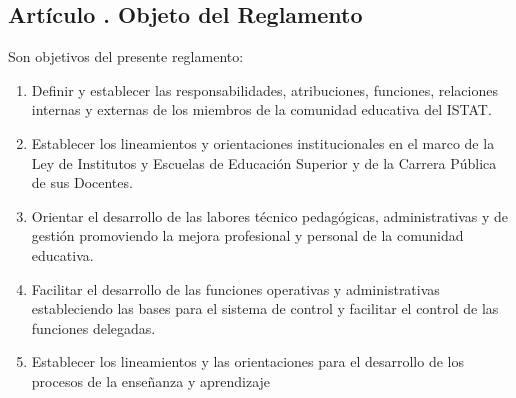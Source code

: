 \subsection{Artículo . Objeto del Reglamento}
\addtocounter{ns}{1}
Son objetivos del presente reglamento:
\begin{enumerate}
\item Definir y establecer las responsabilidades, atribuciones, funciones, relaciones internas y externas de los miembros de la comunidad educativa del ISTAT. 
\item Establecer los lineamientos y orientaciones institucionales en el marco de la Ley de Institutos y Escuelas de Educación Superior y de la Carrera Pública de sus Docentes.  
\item Orientar el desarrollo de las labores técnico pedagógicas, administrativas y de gestión promoviendo la mejora profesional y personal de la comunidad educativa.  
\item Facilitar el desarrollo de las funciones operativas y administrativas estableciendo las bases para el sistema de control y facilitar el control de las funciones delegadas. 
\item Establecer los lineamientos y las orientaciones para el desarrollo de los procesos de la enseñanza y aprendizaje
\end{enumerate}
